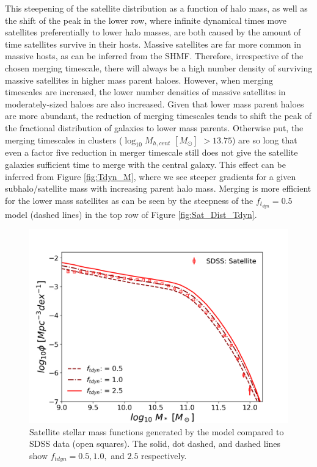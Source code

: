 This steepening of the satellite distribution as a function of halo mass, as well as the shift of the peak in the lower row, where infinite dynamical times move satellites preferentially to lower halo masses, are both caused by the amount of time satellites survive in their hosts. Massive satellites are far more common in massive hosts, as can be inferred from the SHMF. Therefore, irrespective of the chosen merging timescale, there will always be a high number density of surviving massive satellites in higher mass parent haloes. However, when merging timescales are increased, the lower number densities of massive satellites in moderately-sized haloes are also increased. Given that lower mass parent haloes are more abundant, the reduction of merging timescales tends to shift the peak of the fractional distribution of galaxies to lower mass parents. Otherwise put, the merging timescales in clusters ($ \log_{10} M_{h,cent}$ $[M_{\odot}]$ $> 13.75$) are so long that even a factor five reduction in merger timescale still does not give the satellite galaxies sufficient time to merge with the central galaxy. This effect can be inferred from Figure \ref{fig:Tdyn_M}, where we see steeper gradients for a given subhalo/satellite mass with increasing parent halo mass. Merging is more efficient for the lower mass satellites as can be seen by the steepness of the $f_{t_{dyn}} = 0.5$ model (dashed lines) in the top row of Figure \ref{fig:Sat_Dist_Tdyn}.


\begin{figure}[h]
    \centering
    \includegraphics[width = \linewidth]{Figures/Chapter3/Tdyn_SMF.png}
    \caption{Satellite stellar mass functions generated by the model compared to SDSS data (open squares). The solid, dot dashed, and dashed lines show $f_{tdyn} = 0.5, 1.0,$ and $2.5$ respectively.}
    \label{fig:SMF_Tdyn}
\end{figure}

